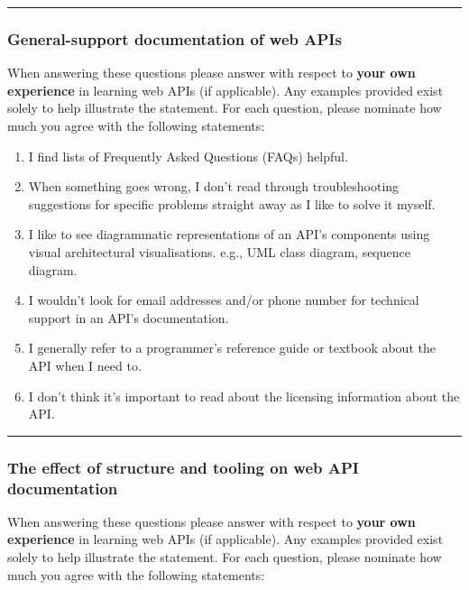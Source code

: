 \bigskip\hrule
\subsubsection*{General-support documentation of web APIs}\noindent
When answering these questions please answer with respect to \textbf{your own experience} in learning web APIs (if applicable). Any examples provided exist solely to help illustrate the statement. For each question, please nominate how much you agree with the following statements: \AgreementScale

\begin{enumerate}[label=Q6\alph*.,leftmargin=2\parindent]
\item  I find lists of Frequently Asked Questions (FAQs) helpful. 
\item  When something goes wrong, I don't read through troubleshooting suggestions for specific problems straight away as I like to solve it myself. 
\item  I like to see diagrammatic representations of an API's components using visual architectural visualisations. 
   e.g., UML class diagram, sequence diagram. 
\item  I wouldn't look for email addresses and/or phone number for technical support in an API's documentation. 
\item  I generally refer to a programmer's reference guide or textbook about the API when I need to. 
\item  I don't think it's important to read about the licensing information about the API. 
\end{enumerate}

\bigskip\hrule
\subsubsection*{The effect of structure and tooling on web API documentation}\noindent
When answering these questions please answer with respect to \textbf{your own experience} in learning web APIs (if applicable). Any examples provided exist solely to help illustrate the statement. For each question, please nominate how much you agree with the following statements: \AgreementScale

